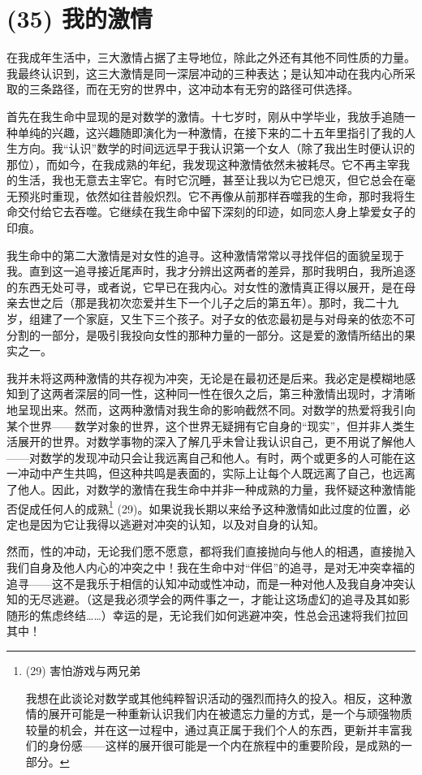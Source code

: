 \section{(35) 我的激情}

在我成年生活中，三大激情占据了主导地位，除此之外还有其他不同性质的力量。我最终认识到，这三大激情是同一深层冲动的三种表达；是认知冲动在我内心所采取的三条路径，而在无穷的世界中，这冲动本有无穷的路径可供选择。

首先在我生命中显现的是对数学的激情。十七岁时，刚从中学毕业，我放手追随一种单纯的兴趣，这兴趣随即演化为一种激情，在接下来的二十五年里指引了我的人生方向。我“认识”数学的时间远远早于我认识第一个女人（除了我出生时便认识的那位），而如今，在我成熟的年纪，我发现这种激情依然未被耗尽。它不再主宰我的生活，我也无意去主宰它。有时它沉睡，甚至让我以为它已熄灭，但它总会在毫无预兆时重现，依然如往昔般炽烈。它不再像从前那样吞噬我的生命，那时我将生命交付给它去吞噬。它继续在我生命中留下深刻的印迹，如同恋人身上挚爱女子的印痕。

我生命中的第二大激情是对女性的追寻。这种激情常常以寻找伴侣的面貌呈现于我。直到这一追寻接近尾声时，我才分辨出这两者的差异，那时我明白，我所追逐的东西无处可寻，或者说，它早已在我内心。对女性的激情真正得以展开，是在母亲去世之后（那是我初次恋爱并生下一个儿子之后的第五年）。那时，我二十九岁，组建了一个家庭，又生下三个孩子。对子女的依恋最初是与对母亲的依恋不可分割的一部分，是吸引我投向女性的那种力量的一部分。这是爱的激情所结出的果实之一。

我并未将这两种激情的共存视为冲突，无论是在最初还是后来。我必定是模糊地感知到了这两者深层的同一性，这种同一性在很久之后，第三种激情出现时，才清晰地呈现出来。然而，这两种激情对我生命的影响截然不同。对数学的热爱将我引向某个世界——数学对象的世界，这个世界无疑拥有它自身的“现实”，但并非人类生活展开的世界。对数学事物的深入了解几乎未曾让我认识自己，更不用说了解他人——对数学的发现冲动只会让我远离自己和他人。有时，两个或更多的人可能在这一冲动中产生共鸣，但这种共鸣是表面的，实际上让每个人既远离了自己，也远离了他人。因此，对数学的激情在我生命中并非一种成熟的力量，我怀疑这种激情能否促成任何人的成熟\footnote{(29) 害怕游戏与两兄弟

我想在此谈论对数学或其他纯粹智识活动的强烈而持久的投入。相反，这种激情的展开可能是一种重新认识我们内在被遗忘力量的方式，是一个与顽强物质较量的机会，并在这一过程中，通过真正属于我们个人的东西，更新并丰富我们的身份感——这样的展开很可能是一个内在旅程中的重要阶段，是成熟的一部分。} (29)。如果说我长期以来给予这种激情如此过度的位置，必定也是因为它让我得以逃避对冲突的认知，以及对自身的认知。

然而，性的冲动，无论我们愿不愿意，都将我们直接抛向与他人的相遇，直接抛入我们自身及他人内心的冲突之中！我在生命中对“伴侣”的追寻，是对无冲突幸福的追寻——这不是我乐于相信的认知冲动或性冲动，而是一种对他人及我自身冲突认知的无尽逃避。（这是我必须学会的两件事之一，才能让这场虚幻的追寻及其如影随形的焦虑终结……）幸运的是，无论我们如何逃避冲突，性总会迅速将我们拉回其中！

